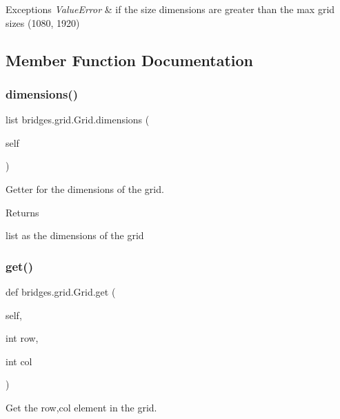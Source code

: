 \begin{DoxyExceptions}{Exceptions}
{\em Value\+Error} & if the size dimensions are greater than the max grid sizes (1080, 1920) \\
\hline
\end{DoxyExceptions}


\subsection{Member Function Documentation}
\mbox{\label{classbridges_1_1grid_1_1_grid_a67078a3d9e8396a2fdfe8dba95156c02}} 
\subsubsection{\texorpdfstring{dimensions()}{dimensions()}}
{\footnotesize\ttfamily  list bridges.\+grid.\+Grid.\+dimensions (\begin{DoxyParamCaption}\item[{}]{self }\end{DoxyParamCaption})}



Getter for the dimensions of the grid. 

\begin{DoxyReturn}{Returns}


list as the dimensions of the grid 
\end{DoxyReturn}
\mbox{\label{classbridges_1_1grid_1_1_grid_a11b6e7f13802b381f0a929baf1c7c8e3}} 
\subsubsection{\texorpdfstring{get()}{get()}}
{\footnotesize\ttfamily def bridges.\+grid.\+Grid.\+get (\begin{DoxyParamCaption}\item[{}]{self,  }\item[{int}]{row,  }\item[{int}]{col }\end{DoxyParamCaption})}



Get the row,col element in the grid. 

